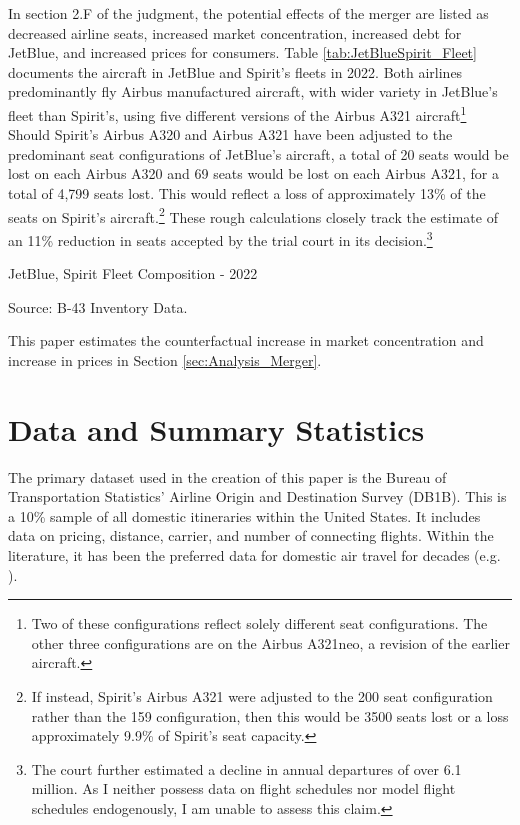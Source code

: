 \documentclass{article}
\begin{document}
	In section 2.F of the judgment, the potential effects of the merger are listed as decreased airline seats, increased market concentration, increased debt for JetBlue, and increased prices for consumers. Table \ref{tab:JetBlueSpirit_Fleet} documents the aircraft in JetBlue and Spirit's fleets in 2022. Both airlines predominantly fly Airbus manufactured aircraft, with wider variety in JetBlue's fleet than Spirit's, using five different versions of the Airbus A321 aircraft\footnote{Two of these configurations reflect solely different seat configurations. The other three configurations are on the Airbus A321neo, a revision of the earlier aircraft.} Should Spirit's Airbus A320 and Airbus A321 have been adjusted to the predominant seat configurations of JetBlue's aircraft, a total of 20 seats would be lost on each Airbus A320 and 69 seats would be lost on each Airbus A321, for a total of 4,799 seats lost. This would reflect a loss of approximately 13\% of the seats on Spirit's aircraft.\footnote{If instead, Spirit's Airbus A321 were adjusted to the 200 seat configuration rather than the 159 configuration, then this would be 3500 seats lost or a loss approximately 9.9\% of Spirit's seat capacity.} These rough calculations closely track the estimate of an 11\% reduction in seats accepted by the trial court in its decision.\footnote{The court further estimated a decline in annual departures of over 6.1 million. As I neither possess data on flight schedules nor model flight schedules endogenously, I am unable to assess this claim.} 
    
    \begin{table}
        \begin{center}
            \caption{JetBlue, Spirit Fleet Composition - 2022}
            \label{tab:JetBlueSpirit_Fleet}
            \vspace{-10mm}
            
        \end{center}
        \footnotesize{Source: B-43 Inventory Data.}
    \end{table}

    This paper estimates the counterfactual increase in market concentration and increase in prices in Section \ref{sec:Analysis_Merger}. 

	\section{Data and Summary Statistics}
	\label{sec:Data}
	The primary dataset used in the creation of this paper is the Bureau of Transportation Statistics' Airline Origin and Destination Survey (DB1B). This is a 10\% sample of all domestic itineraries within the United States. It includes data on pricing, distance, carrier, and number of connecting flights. Within the literature, it has been the preferred data for domestic air travel for decades (e.g.  \citet{ciliberto_market_2021, berry_tracing_2010, goolsbee_how_2008, peters_evaluating_2006}). 
    
\end{document}
